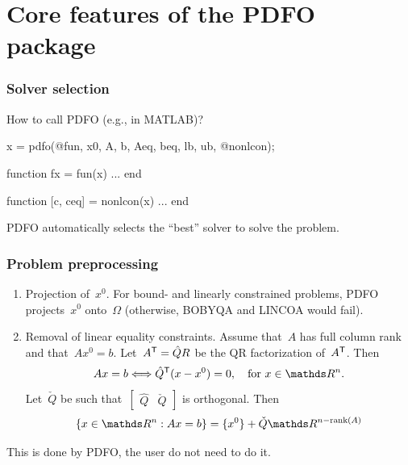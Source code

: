 \documentclass{polyu-presentation}
\begin{document}
\section{Core features of the PDFO package}

\begin{frame}[fragile]
    \frametitle{Solver selection}

    \begin{block}{How to call PDFO (e.g., in MATLAB)?}
        \begin{lstmatlab}
            x = pdfo(@fun, x0, A, b, Aeq, beq, lb, ub, @nonlcon);
        
            function fx = fun(x)
            ...
            end
        
            function [c, ceq] = nonlcon(x)
            ...
            end
        \end{lstmatlab}
    \end{block}

    \medskip

    PDFO \alert{automatically selects} the \enquote{best} solver to solve the problem.
\end{frame}

\begin{frame}
    \frametitle{Problem preprocessing}

	\begin{enumerate}
        \item \alert{Projection of~$x^0$}.
        For bound- and linearly constrained problems, PDFO projects~$x^0$ onto~$\Omega$ (otherwise, BOBYQA and LINCOA would fail).
        \item \alert{Removal of linear equality constraints}.
        Assume that~$A$ has full column rank and that~$A x^0 = b$.
        Let~$A^{\mathsf{T}} = \hat{Q} R$ be the \alert{QR factorization} of~$A^{\mathsf{T}}$.
        Then
        \begin{equation*}
            A x = b \Longleftrightarrow \hat{Q}^{\T} (x - x^0) = 0, \quad \text{for~$x \in \R^n$}.
        \end{equation*}
        Let~$\check{Q}$ be such that~$\begin{bmatrix} \hat{Q} & \check{Q} \end{bmatrix}$ is \alert{orthogonal}.
        Then
        \begin{equation*}
            \set{x \in \R^n : A x = b} = \set{x^0} + \check{Q} \R^{n - \rank(A)}
        \end{equation*}
    \end{enumerate}

    \medskip

    \begin{block}{}
        This is done by PDFO, the user do \alert{not need} to do it.
    \end{block}
\end{frame}
\end{document}
